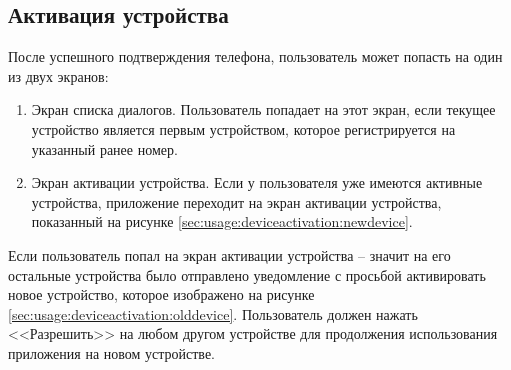 \subsection{Активация устройства}
\label{sec:usage:deviceactivation}

После успешного подтверждения телефона, пользователь может попасть на один из двух экранов:

\begin{enumerate}
	\item Экран списка диалогов. Пользователь попадает на этот экран, если текущее устройство является первым устройством, которое регистрируется на указанный ранее номер.
	\item Экран активации устройства. Если у пользователя уже имеются активные устройства, приложение переходит на экран активации устройства, показанный на рисунке \ref{sec:usage:deviceactivation:newdevice}.
\end{enumerate}

Если пользователь попал на экран активации устройства -- значит на его остальные устройства было отправлено уведомление с просьбой активировать новое устройство, которое изображено на рисунке \ref{sec:usage:deviceactivation:olddevice}. Пользователь должен нажать <<Разрешить>> на любом другом устройстве для продолжения использования приложения на новом устройстве.

